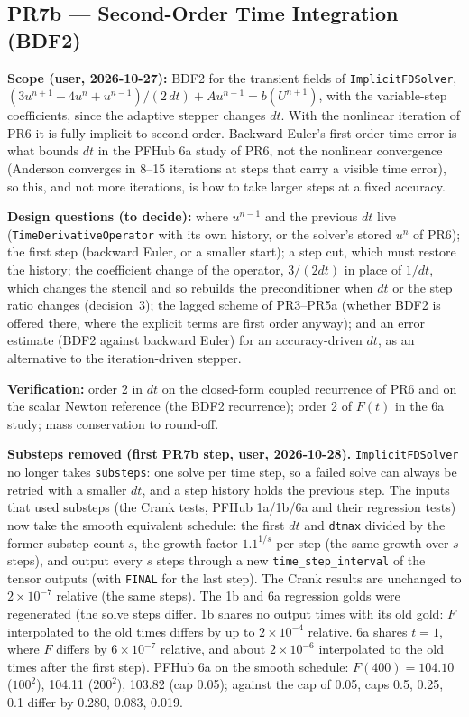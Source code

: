 \documentclass[11pt]{article}
\newcommand{\pr}[2]{\subsection{PR#1 --- #2}}
\begin{document}
\pr{7b}{Second-Order Time Integration (BDF2)}
\textbf{Scope (user, 2026-10-27):} BDF2 for the transient fields of
\texttt{ImplicitFDSolver}, $(3u^{n+1} - 4u^n + u^{n-1})/(2\,dt) + A u^{n+1} = b(U^{n+1})$,
with the variable-step coefficients, since the adaptive stepper changes $dt$.
With the nonlinear iteration of PR6 it is fully implicit to second order. Backward
Euler's first-order time error is what bounds $dt$ in the PFHub 6a study of PR6, not
the nonlinear convergence (Anderson converges in 8--15 iterations at steps that
carry a visible time error), so this, and not more iterations, is how to take
larger steps at a fixed accuracy.

\textbf{Design questions (to decide):} where $u^{n-1}$ and the previous $dt$ live
(\texttt{TimeDerivativeOperator} with its own history, or the solver's stored $u^n$
of PR6); the first step (backward Euler, or a smaller start); a step cut, which must
restore the history; the coefficient change of the operator, $3/(2dt)$ in place of
$1/dt$, which changes the stencil and so rebuilds the preconditioner when $dt$ or the
step ratio changes (decision~3); the lagged scheme of PR3--PR5a (whether BDF2 is
offered there, where the explicit terms are first order anyway); and an error
estimate (BDF2 against backward Euler) for an accuracy-driven $dt$, as an
alternative to the iteration-driven stepper.

\textbf{Verification:} order 2 in $dt$ on the closed-form coupled recurrence of PR6
and on the scalar Newton reference (the BDF2 recurrence); order 2 of $F(t)$ in the
6a study; mass conservation to round-off.

\textbf{Substeps removed (first PR7b step, user, 2026-10-28).} \texttt{ImplicitFDSolver}
no longer takes \texttt{substeps}: one solve per time step, so a failed solve can always be
retried with a smaller $dt$, and a step history holds the previous step. The inputs that
used substeps (the Crank tests, PFHub 1a/1b/6a and their regression tests) now take the
smooth equivalent schedule: the first $dt$ and \texttt{dtmax} divided by the former substep
count $s$, the growth factor $1.1^{1/s}$ per step (the same growth over $s$ steps), and
output every $s$ steps through a new \texttt{time\_step\_interval} of the tensor outputs
(with \texttt{FINAL} for the last step). The Crank results are unchanged to $2\times10^{-7}$
relative (the same steps). The 1b and 6a regression golds were regenerated (the solve steps
differ. 1b shares no output times with its old gold: $F$ interpolated to the old times differs
by up to $2\times10^{-4}$ relative. 6a shares $t = 1$, where $F$ differs by $6\times10^{-7}$
relative, and about $2\times10^{-6}$ interpolated to the old times after the first step). PFHub 6a on the smooth schedule: $F(400) = 104.10$ ($100^2$), 104.11
($200^2$), 103.82 (cap 0.05); against the cap of 0.05, caps 0.5, 0.25, 0.1 differ by
0.280, 0.083, 0.019.
\end{document}
